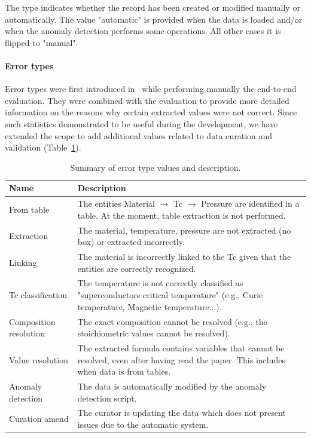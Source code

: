 \documentclass[a4paper]{article}
\begin{document}
The type indicates whether the record has been created or modified manually or automatically. The value "automatic" is provided when the data is loaded and/or when the anomaly detection performs some operations. All other cases it is flipped to "manual". 

\paragraph{Error types} Error types were first introduced in~\cite{lfoppiano2023automatic} while performing manually the end-to-end evaluation. They were combined with the evaluation to provide more detailed information on the reasons why certain extracted values were not correct. 
Since such statistics demonstrated to be useful during the development, we have extended the scope to add additional values related to data curation and validation (Table~\ref{tab:error-types}).

\begin{table}[htbp]
\centering
\begin{tabular}{|p{4cm}|p{8cm}|}
\hline
\textbf{Name} & \textbf{Description} \\
\hline
From table & The entities Material $\rightarrow$ Tc $\rightarrow$ Pressure are identified in a table. At the moment, table extraction is not performed. \\
\hline
Extraction & The material, temperature, pressure are not extracted (no box) or extracted incorrectly. \\
\hline
Linking & The material is incorrectly linked to the Tc given that the entities are correctly recognized. \\
\hline
Tc classification & The temperature is not correctly classified as "superconductors critical temperature" (e.g., Curie temperature, Magnetic temperature...). \\
\hline
Composition resolution & The exact composition cannot be resolved (e.g., the stoichiometric values cannot be resolved). \\
\hline
Value resolution & The extracted formula contains variables that cannot be resolved, even after having read the paper. This includes when data is from tables. \\
\hline
Anomaly detection & The data is automatically modified by the anomaly detection script. \\
\hline
Curation amend & The curator is updating the data which does not present issues due to the automatic system. \\
\hline
\end{tabular}
\caption{Summary of error type values and description.}
\label{tab:error-types}
\end{table}
\end{document}
